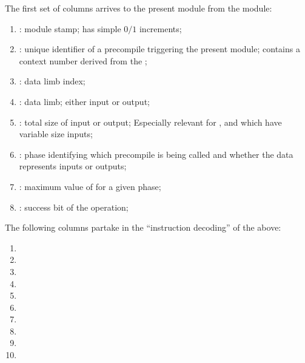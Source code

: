 The first set of columns arrives to the present module from the \mmioMod{} module:
\begin{enumerate}
      \item \blsStamp{}: %
            module stamp; has simple $0/1$ increments;
      \item \blsId{}: %
            unique identifier of a precompile  triggering the present module;
            contains a context number derived from the \hubStamp{};
      \item \blsIndex{}: %
            data limb index;
      \item \blsLimb{}: %
            data limb; either input or output;
      \item \blsTotalSize{}: %
            total size of input or output; Especially relevant for ,  and  which have variable size inputs;
      \item \blsPhase{}: %
            phase identifying which precompile is being called and whether the data represents inputs or outputs;
      \item \indexMax{}: %
            maximum value of \blsIndex{} for a given phase;
      \item \blsSuccessBit{} \hubMmuMmioBlsPrediction{} \markAsPartiallyJustifiedHere{}:
            success bit of the operation;
\end{enumerate}

The following columns partake in the ``instruction decoding'' of the above:
\begin{multicols}{2}
      \begin{enumerate}
        \item \isBlsGOneAddData             
        \item \isBlsGOneAddResult           
        \item \isBlsGTwoAddData             
        \item \isBlsGTwoAddResult           
        \item \isBlsGOneMsmData             
        \item \isBlsGOneMsmResult           
        \item \isBlsMapFpToGOneData         
        \item \isBlsMapFpToGOneResult       
        \item \isBlsMapFpToGTwoData         
        \item \isBlsMapFpTwoToGTwoResult           
      \end{enumerate}
\end{multicols}

